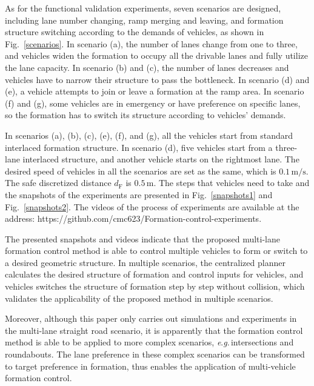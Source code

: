 \documentclass[journal]{IEEEtranTIE}
\newcommand{\eg}{\textit{e}.\textit{g}.}
\begin{document}
As for the functional validation experiments, seven scenarios are designed, including lane number changing, ramp merging and leaving, and formation structure switching according to the demands of vehicles, as shown in Fig.~\ref{scenarios}. In scenario (a), the number of lanes change from one to three, and vehicles widen the formation to occupy all the drivable lanes and fully utilize the lane capacity. In scenario (b) and (c), the number of lanes decreases and vehicles have to narrow their structure to pass the bottleneck. In scenario (d) and (e), a vehicle attempts to join or leave a formation at the ramp area. In scenario (f) and (g), some vehicles are in emergency or have preference on specific lanes, so the formation has to switch its structure according to vehicles' demands. 

In scenarios (a), (b), (c), (e), (f), and (g), all the vehicles start from standard interlaced formation structure. In scenario (d), five vehicles start from a three-lane interlaced structure, and another vehicle starts on the rightmost lane. The desired speed of vehicles in all the scenarios are set as the same, which is $0.1\,\mathrm{m/s}$. The safe discretized distance $d_\text{F}$ is $0.5\,\mathrm{m}$. The steps that vehicles need to take and the snapshots of the experiments are presented in Fig.~\ref{snapshots1} and Fig.~\ref{snapshots2}. The videos of the process of experiments are available at the address: {\color{blue}https://github.com/cmc623/Formation-control-experiments}.

The presented snapshots and videos indicate that the proposed multi-lane formation control method is able to control multiple vehicles to form or switch to a desired geometric structure. In multiple scenarios, the centralized planner calculates the desired structure of formation and control inputs for vehicles, and vehicles switches the structure of formation step by step without collision, which validates the applicability of the proposed method in multiple scenarios.

Moreover, although this paper only carries out simulations and experiments in the multi-lane straight road scenario, it is apparently that the formation control method is able to be applied to more complex scenarios, \eg\,intersections and roundabouts. The lane preference in these complex scenarios can be transformed to target preference in formation, thus enables the application of multi-vehicle formation control.
\end{document}
